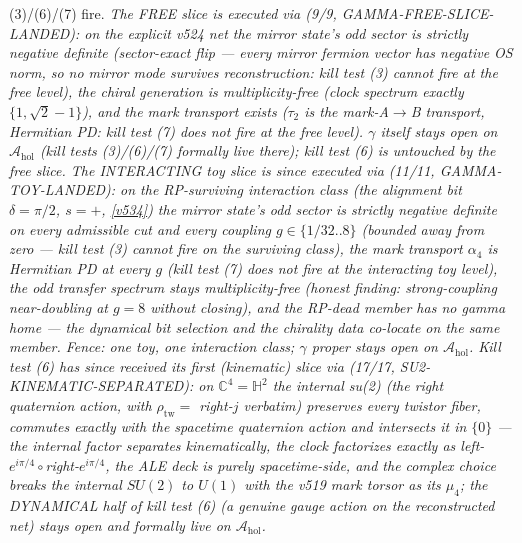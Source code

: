 (3)/(6)/(7) fire. \emph{The FREE slice is executed via
 (9/9, GAMMA-FREE-SLICE-LANDED): on the explicit v524 net
the mirror state's odd sector is \emph{strictly negative definite} (sector-exact flip ---
every mirror fermion vector has negative OS norm, so no mirror mode survives reconstruction:
kill test (3) cannot fire at the free level), the chiral generation is multiplicity-free
(clock spectrum exactly $\{1,\sqrt2-1\}$), and the mark transport exists ($\tau_2$ is the
mark-A$\to$B transport, Hermitian PD: kill test (7) does not fire at the free level).
$\gamma$ itself stays open on $\mathcal A_{\mathrm{hol}}$ (kill tests (3)/(6)/(7) formally
live there); kill test (6) is untouched by the free slice.  The INTERACTING toy slice is
since executed via  (11/11, GAMMA-TOY-LANDED): on
the RP-surviving interaction class (the alignment bit $\delta=\pi/2$, $s=+$, \vref{v534})
the mirror state's odd sector is \emph{strictly negative definite} on every admissible cut
and every coupling $g\in\{1/32..8\}$ (bounded away from zero --- kill test (3) cannot fire
on the surviving class), the mark transport $\alpha_4$ is Hermitian PD at every $g$ (kill
test (7) does not fire at the interacting toy level), the odd transfer spectrum stays
multiplicity-free (honest finding: strong-coupling near-doubling at $g=8$ without
closing), and the RP-dead member has no gamma home --- the dynamical bit selection and the
chirality data \emph{co-locate} on the same member.  Fence: one toy, one interaction
class; $\gamma$ proper stays open on $\mathcal A_{\mathrm{hol}}$.  Kill test (6) has since
received its first (kinematic) slice via  (17/17,
SU2-KINEMATIC-SEPARATED): on $\mathbb C^4=\mathbb H^2$ the internal su(2) (the right
quaternion action, with $\rho_{\mathrm{tw}}=$ right-$j$ verbatim) preserves every twistor
fiber, commutes exactly with the spacetime quaternion action and intersects it in $\{0\}$
--- the internal factor \emph{separates} kinematically, the clock factorizes exactly as
left-$e^{i\pi/4}\circ$right-$e^{i\pi/4}$, the ALE deck is purely spacetime-side, and the
complex choice breaks the internal $SU(2)$ to $U(1)$ with the v519 mark torsor as its
$\mu_4$; the DYNAMICAL half of kill test (6) (a genuine gauge action on the reconstructed
net) stays open and formally live on $\mathcal A_{\mathrm{hol}}$.}

